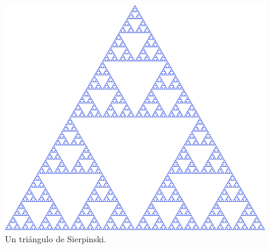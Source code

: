 \documentclass{article}
\theoremstyle{definition}
\begin{document}
\begin{figure}[!htbp]
\begin{center}
\includegraphics[scale=0.2]{spin2.png}
\caption{Un triángulo de Sierpinski. \citep{wiki:xxx}}
\end{center}
\end{figure}


\clearpage

\end{document}
